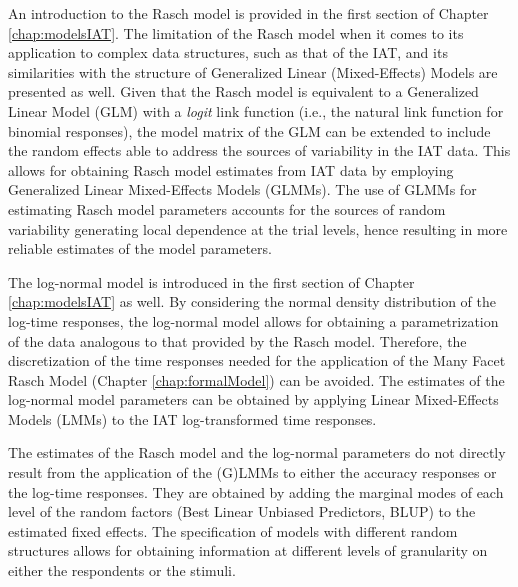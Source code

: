 \documentclass[12pt]{book}
\begin{document}
An introduction to the Rasch model is provided in the first section of Chapter \ref{chap:modelsIAT}. 
The limitation of the Rasch model when it comes to its application to complex data structures, such as that of the IAT, and its similarities with the structure of Generalized Linear (Mixed-Effects) Models are presented as well. 
Given that the Rasch model is equivalent to a Generalized Linear Model (GLM) with a \emph{logit} link function (i.e., the natural link function for binomial responses), the model matrix of the GLM can be extended to include the random effects able to address the sources of variability in the IAT data. This allows for obtaining Rasch model estimates from IAT data by employing Generalized Linear Mixed-Effects Models (GLMMs). 
The use of GLMMs for estimating Rasch model parameters accounts for the sources of random variability generating local dependence at the trial levels, hence resulting in more reliable estimates of the model parameters. 

The log-normal model is introduced in the first section of Chapter \ref{chap:modelsIAT} as well. By considering the normal density distribution of the log-time responses, the log-normal model allows for obtaining a parametrization of the data analogous to that provided by the Rasch model. 
Therefore, the discretization of the time responses needed for the application of the Many Facet Rasch Model (Chapter \ref{chap:formalModel}) can be avoided. 
The estimates of the log-normal model parameters can be obtained by applying Linear Mixed-Effects Models (LMMs) to the IAT log-transformed time responses.


The estimates of the Rasch model and the log-normal parameters do not directly result from the application of the (G)LMMs to either the accuracy responses or the log-time responses. 
They are obtained by adding the marginal modes of each level of the random factors (Best Linear Unbiased Predictors, BLUP) to the estimated fixed effects. The specification of  models with different random structures allows for obtaining information at different levels of granularity on either the respondents or the stimuli.
\end{document}
